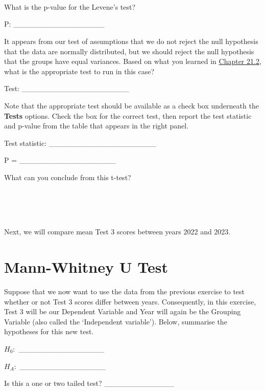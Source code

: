 \documentclass[
]{scrbook}
\begin{document}
\begin{verbatim}




\end{verbatim}

What is the p-value for the Levene's test?

P: \_\_\_\_\_\_\_\_\_\_\_\_\_\_\_\_\_

It appears from our test of assumptions that we do not reject the null hypothesis that the data are normally distributed, but we should reject the null hypothesis that the groups have equal variances.
Based on what you learned in \protect\hyperlink{independent-samples-t-test}{Chapter 21.2}, what is the appropriate test to run in this case?

Test: \_\_\_\_\_\_\_\_\_\_\_\_\_\_\_\_\_\_\_\_

Note that the appropriate test should be available as a check box underneath the \textbf{Tests} options.
Check the box for the correct test, then report the test statistic and p-value from the table that appears in the right panel.

Test statistic: \_\_\_\_\_\_\_\_\_\_\_\_\_\_\_\_\_\_\_\_

P = \_\_\_\_\_\_\_\_\_\_\_\_\_\_\_\_\_\_

What can you conclude from this t-test?

\begin{verbatim}




\end{verbatim}

Next, we will compare mean Test 3 scores between years 2022 and 2023.

\hypertarget{mann-whitney-u-test-1}{%
\section{Mann-Whitney U Test}\label{mann-whitney-u-test-1}}

Suppose that we now want to use the data from the previous exercise to test whether or not Test 3 scores differ between years.
Consequently, in this exercise, Test 3 will be our Dependent Variable and Year will again be the Grouping Variable (also called the `Independent variable').
Below, summarise the hypotheses for this new test.

\(H_{0}:\) \_\_\_\_\_\_\_\_\_\_\_\_\_\_\_\_

\(H_{A}:\) \_\_\_\_\_\_\_\_\_\_\_\_\_\_\_\_

Is this a one or two tailed test? \_\_\_\_\_\_\_\_\_\_\_\_\_
\end{document}
